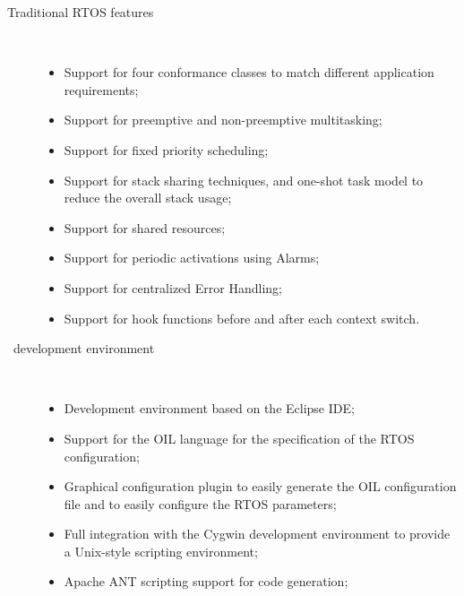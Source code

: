 \begin{description}
\item[Traditional RTOS features] ~
  \begin{itemize}
  \item Support for four conformance classes to match different
    application requirements;
  \item Support for preemptive and non-preemptive multitasking;
  \item Support for fixed priority scheduling;
  \item Support for stack sharing techniques, and one-shot task model
    to reduce the overall stack usage;
  \item Support for shared resources;
  \item Support for periodic activations using Alarms;
  \item Support for centralized Error Handling;
  \item Support for hook functions before and after each context
    switch.
  \end{itemize}

\item[\rtd\ development environment] ~
  \begin{itemize}
  \item Development environment based on the Eclipse IDE;
  \item Support for the OIL language for the specification of the RTOS
    configuration;
  \item Graphical configuration plugin to easily generate the OIL
    configuration file and to easily configure the RTOS parameters;
  \item Full integration with the Cygwin development environment to
    provide a Unix-style scripting environment;
  \item Apache ANT scripting support for code generation;
  \end{itemize}


\end{description}
